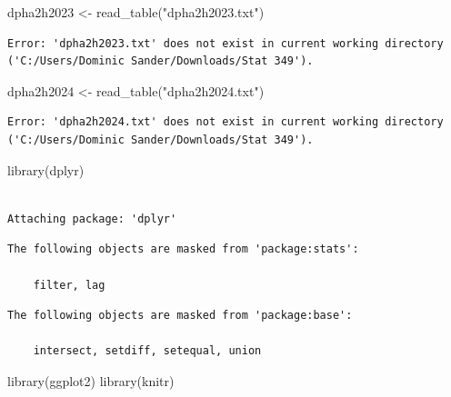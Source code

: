 \documentclass[
  letterpaper,
  DIV=11,
  numbers=noendperiod]{scrreprt}
\newenvironment{Shaded}{\begin{snugshade}}{\end{snugshade}}
\newcommand{\FunctionTok}[1]{\textcolor[rgb]{0.28,0.35,0.67}{#1}}
\newcommand{\NormalTok}[1]{\textcolor[rgb]{0.00,0.23,0.31}{#1}}
\newcommand{\OtherTok}[1]{\textcolor[rgb]{0.00,0.23,0.31}{#1}}
\newcommand{\StringTok}[1]{\textcolor[rgb]{0.13,0.47,0.30}{#1}}
\begin{document}
\begin{Shaded}
\begin{Highlighting}[]
\NormalTok{dpha2h2023 }\OtherTok{\textless{}{-}} \FunctionTok{read\_table}\NormalTok{(}\StringTok{"dpha2h2023.txt"}\NormalTok{)}
\end{Highlighting}
\end{Shaded}

\begin{verbatim}
Error: 'dpha2h2023.txt' does not exist in current working directory ('C:/Users/Dominic Sander/Downloads/Stat 349').
\end{verbatim}

\begin{Shaded}
\begin{Highlighting}[]
\NormalTok{dpha2h2024 }\OtherTok{\textless{}{-}} \FunctionTok{read\_table}\NormalTok{(}\StringTok{"dpha2h2024.txt"}\NormalTok{)}
\end{Highlighting}
\end{Shaded}

\begin{verbatim}
Error: 'dpha2h2024.txt' does not exist in current working directory ('C:/Users/Dominic Sander/Downloads/Stat 349').
\end{verbatim}

\begin{Shaded}
\begin{Highlighting}[]
\FunctionTok{library}\NormalTok{(dplyr)}
\end{Highlighting}
\end{Shaded}

\begin{verbatim}

Attaching package: 'dplyr'
\end{verbatim}

\begin{verbatim}
The following objects are masked from 'package:stats':

    filter, lag
\end{verbatim}

\begin{verbatim}
The following objects are masked from 'package:base':

    intersect, setdiff, setequal, union
\end{verbatim}

\begin{Shaded}
\begin{Highlighting}[]
\FunctionTok{library}\NormalTok{(ggplot2)}
\FunctionTok{library}\NormalTok{(knitr)}
\end{Highlighting}
\end{Shaded}
\end{document}
